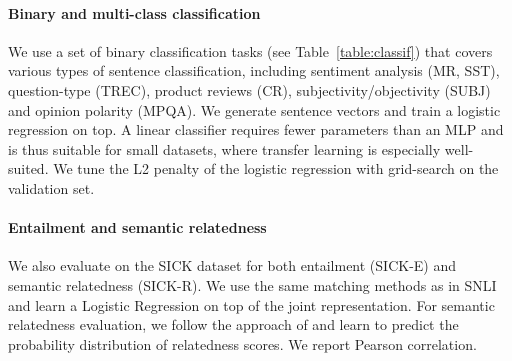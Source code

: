 \documentclass[11pt,letterpaper]{article}
\begin{document}
\paragraph{Binary and multi-class classification}
We use a set of binary classification tasks (see Table~\ref{table:classif}) that covers various types of sentence classification, including sentiment analysis (MR, SST), question-type (TREC), product reviews (CR), subjectivity/objectivity (SUBJ) and opinion polarity (MPQA). We generate sentence vectors and train a logistic regression on top. A linear classifier requires fewer parameters than an MLP and is thus suitable for small datasets, where transfer learning is especially well-suited. We tune the L2 penalty of the logistic regression with grid-search on the validation set. 


\paragraph{Entailment and semantic relatedness}
We also evaluate on the SICK dataset for both entailment (SICK-E) and semantic relatedness (SICK-R). We use the same matching methods as in SNLI and learn a Logistic Regression on top of the joint representation. 
For semantic relatedness evaluation, we follow the approach of \cite{tai2015improved} and learn to predict the probability distribution of relatedness scores.
We report Pearson correlation. 
\end{document}
